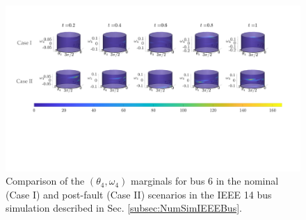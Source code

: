 \documentclass[10pt,twocolumn]{IEEEtran}
\begin{document}
\begin{figure}[t]
\centering
\includegraphics[width=0.8\linewidth]{IEEE14BivariateMarginalComparison.pdf}
\caption{\small{Comparison of the $(\theta_{4},\omega_{4})$ marginals for bus 6 in the nominal (Case I) and post-fault (Case II) scenarios in the IEEE 14 bus simulation described in Sec. \ref{subsec:NumSimIEEEBus}.}}
\vspace*{-0.2in}
\label{fig:IEEE14marginalsBivariateComparison}
\end{figure}



\end{document}
